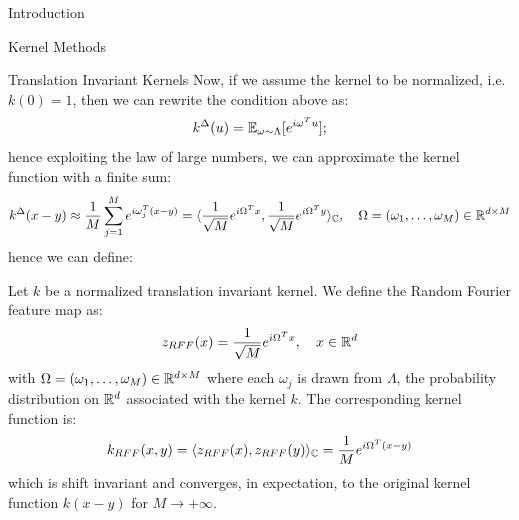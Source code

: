 \begin{chapter}{Introduction}
\begin{section}{Kernel Methods}
\begin{subsection}{Translation Invariant Kernels}
      Now, if we assume the kernel to be normalized, i.e. $k(0)=1$, then we can rewrite the condition above as:
      $$k^\Delta(u) = \mathbb{E}_{\omega \sim \Lambda}[e^{i \omega^T u}];$$
      hence exploiting the law of large numbers, we can approximate the kernel function with a finite sum:
      $$k^\Delta (x-y) \approx \frac{1}{M}\sum_{j=1}^M e^{i \omega_j^T (x-y)} = \langle \frac{1}{\sqrt{M}}e^{i \Omega^T x}, \frac{1}{\sqrt{M}}e^{i \Omega^T y} \rangle_{\mathbb{C}}, \quad \Omega = (\omega_1, \dots, \omega_M) \in \mathbb{R}^{d\times M} $$
      hence we can define:
      \begin{definition}
          Let $k$ be a normalized translation invariant kernel. We define the Random Fourier feature map as:
          $$z_{RFF}(x) = \frac{1}{\sqrt{M}}e^{i \Omega^T x}, \quad x \in \mathbb{R}^d$$
          with $\Omega = (\omega_1, \dots, \omega_M) \in \mathbb{R}^{d\times M}$ where each $\omega_j$ is drawn from $\Lambda$, the probability distribution on $\mathbb{R}^d$ associated with the kernel $k$.
          The corresponding kernel function is:
          $$
              k_{RFF}(x,y) = \langle z_{RFF}(x), z_{RFF}(y) \rangle_{\mathbb{C}} = \frac{1}{M}e^{i \Omega^T (x-y)}
          $$
          which is shift invariant and converges, in expectation, to the original kernel function $k(x-y)$ for $M \to +\infty$.


\end{definition}
\end{subsection}
\end{section}
\end{chapter}
